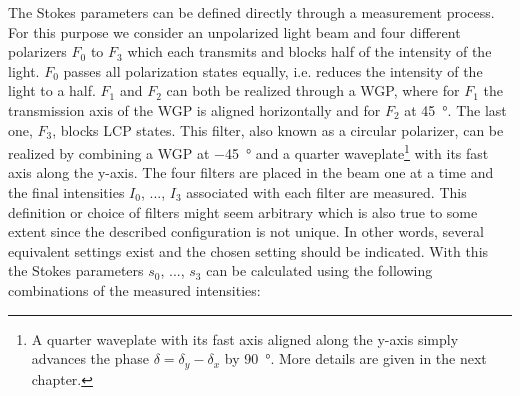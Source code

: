 The Stokes parameters can be defined directly through a measurement process. For this purpose we consider an unpolarized light beam and four different polarizers $F_0$ to $F_3$ which each transmits and blocks half of the intensity of the light. $F_0$ passes all polarization states equally, i.e. reduces the intensity of the light to a half. $F_1$ and $F_2$ can both be realized through a WGP, where for $F_1$ the transmission axis of the WGP is aligned horizontally and for $F_2$ at \SI{45}{\degree}. The last one, $F_3$, blocks LCP states. This filter, also known as a circular polarizer, can be realized by combining a WGP at \SI{-45}{\degree} and a quarter waveplate\footnote{A quarter waveplate with its fast axis aligned along the y-axis simply advances the phase $\delta=\delta_y-\delta_x$ by \SI{90}{\degree}. More details are given in the next chapter.} with its fast axis along the y-axis. The four filters are placed in the beam one at a time and the final intensities $I_0$, ..., $I_3$ associated with each filter are measured. This definition or choice of filters might seem arbitrary which is also true to some extent since the described configuration is not unique. In other words, several equivalent settings exist and the chosen setting should be indicated. With this the Stokes parameters $s_0$, ..., $s_3$ can be calculated using the following combinations of the measured intensities:

